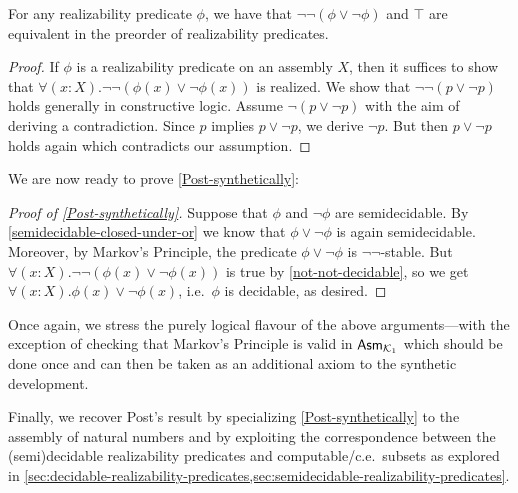 \begin{lemma}\label{not-not-decidable}
  For any realizability predicate \(\phi\), we have that
  \(\lnot\lnot(\phi\lor\lnot\phi)\) and \(\top\) are equivalent in the preorder
  of realizability predicates.
\end{lemma}
\begin{proof}
  If \(\phi\) is a realizability predicate on an assembly \(X\), then it
  suffices to show that \(\forall(x : X).\lnot\lnot(\phi(x)\lor\lnot\phi(x))\)
  is realized.
  We show that \(\lnot\lnot(p \lor \lnot p)\) holds generally in constructive
  logic.
  Assume \(\lnot(p \lor \lnot p)\) with the aim of deriving a contradiction.
  Since \(p\) implies \(p \lor \lnot p\), we derive \(\lnot p\).
  But then \(p \lor \lnot p\) holds again which contradicts our assumption.
\end{proof}

We are now ready to prove \cref{Post-synthetically}:
\begin{proof}[Proof of \cref{Post-synthetically}]
  Suppose that \(\phi\) and \(\lnot\phi\) are semidecidable.
  By \cref{semidecidable-closed-under-or} we know that \(\phi\lor\lnot\phi\) is
  again semidecidable.
  Moreover, by Markov's Principle, the predicate \(\phi\lor\lnot\phi\) is
  \(\lnot\lnot\)-stable.
  But \(\forall(x:X).\lnot\lnot(\phi(x)\lor\lnot\phi(x))\) is true by
  \cref{not-not-decidable}, so we get \(\forall(x:X).\phi(x)\lor\lnot\phi(x)\),
  i.e.\ \(\phi\) is decidable, as desired.
\end{proof}

Once again, we stress the purely logical flavour of the above arguments---with
the exception of checking that Markov's Principle is valid in \(\mathsf{Asm}_{\mathcal{K}_1}\)
which should be done once and can then be taken as an additional axiom to the
synthetic development.

Finally, we recover Post's result by specializing \cref{Post-synthetically} to
the assembly of natural numbers and by exploiting the correspondence between the
(semi)decidable realizability predicates and computable/c.e.\ subsets as
explored in
\cref{sec:decidable-realizability-predicates,sec:semidecidable-realizability-predicates}.



